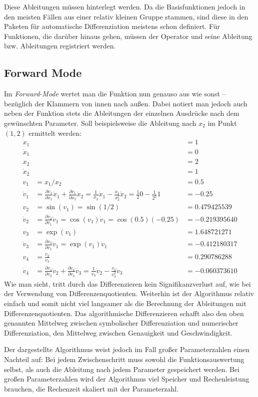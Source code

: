 \documentclass{scrartcl}
\begin{document}
Diese Ableitungen müssen hinterlegt werden. Da die Basisfunktionen jedoch in den meisten Fällen aus einer relativ kleinen Gruppe stammen, sind diese in den Paketen für automatische Differenziation meistens schon definiert. Für Funktionen, die darüber hinaus gehen, müssen der Operator und seine Ableitung bzw. Ableitungen registriert werden.
\subsection{Forward Mode}

Im \emph{Forward-Mode} wertet man die Funktion nun genauso aus wie sonst -- bezüglich der Klammern von innen nach außen. Dabei notiert man jedoch auch neben der Funktion stets die Ableitungen der einzelnen Ausdrücke nach dem gewünschten Parameter. Soll beispielsweise die Ableitung nach $x_2$ im Punkt $(1,2)$ ermittelt werden:
\begin{equation*}
\begin{aligned}
	x_1 &&= 1\\
	\dot{x}_1 &&= 0\\[0.3cm]
	x_2 &&= 2\\
	\dot{x}_2 &&= 1\\[0.3cm]
	v_1 &= x_1/x_2 &= \num{0,5} \\
	\dot{v}_1 &= \tfrac{\partial v_1}{\partial x_1}\dot{x}_1 + \tfrac{\partial v_1}{\partial x_2}\dot{x}_2 = \tfrac{1}{x_2}\dot{x}_1 - \tfrac{x_1}{x_2^2}\dot{x}_2 = \tfrac{1}{2}0 - \tfrac{1}{2^2}1 &= \num{-0,25}\\[0.3cm]
	v_2 &= \sin(v_1) = \sin(1/2) &= \num{0.479425539}\\
	\dot{v}_2 &= \tfrac{\partial v_2}{\partial v_1}\dot{v}_1 = \cos(v_1)\dot v_1 = \cos(\num{0,5})(-\num{0,25}) &= \num{-0.219395640}\\[0.3cm]
	v_3 &= \exp(v_1) &= \num{1.648721271}\\
	\dot v_3 &= \tfrac{\partial v_3}{\partial v_1}\dot v_1 = \exp(v_1)\dot v_1 &= \num{-0.412180317} \\[0.3cm]
	v_4 &= \tfrac{v_2}{v_3} &= \num{0.290786288} \\
	\dot v_4 &= \tfrac{\partial v_4}{\partial v_2} \dot v_2 + \tfrac{\partial v_4}{\partial v_3}\dot v_3 = \tfrac{1}{v_3}\dot v_2 - \tfrac{v_2}{v_3^2}\dot v_3 &= \num{-0.060373610}
\end{aligned}
\end{equation*}
Wie man sieht, tritt durch das Differenzieren kein Signifikanzverlust auf, wie bei der Verwendung von Differenzenquotienten. Weiterhin ist der Algorithmus relativ einfach und somit nicht viel langsamer als die Berechnung der Ableitungen mit Differenzenquotienten. Das algorithmische Differenzieren schafft also den oben genannten Mittelweg zwischen symbolischer Differenziation und numerischer Differenziation, den Mittelweg zwischen Genauigkeit und Geschwindigkeit.\par
Der dargestellte Algorithmus weist jedoch im Fall großer Parameterzahlen einen Nachteil auf: Bei jedem Zwischenschritt muss sowohl die Funktionsauswertung selbst, als auch die Ableitung nach jedem Parameter gespeichert werden. Bei großen Parameterzahlen wird der Algorithmus viel Speicher und Rechenleistung brauchen, die Rechenzeit skaliert mit der Parameterzahl.
\end{document}
